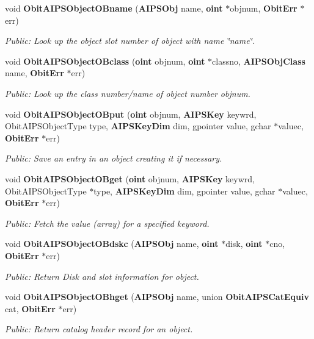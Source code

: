 \begin{CompactItemize}
void {\bf Obit\-AIPSObject\-OBname} ({\bf AIPSObj} name, {\bf oint} $\ast$objnum, {\bf Obit\-Err} $\ast$err)
\begin{CompactList}\small\item\em Public: Look up the object slot number of object with name \char`\"{}name\char`\"{}. \item\end{CompactList}\item 
void {\bf Obit\-AIPSObject\-OBclass} ({\bf oint} objnum, {\bf oint} $\ast$classno, {\bf AIPSObj\-Class} name, {\bf Obit\-Err} $\ast$err)
\begin{CompactList}\small\item\em Public: Look up the class number/name of object number objnum. \item\end{CompactList}\item 
void {\bf Obit\-AIPSObject\-OBput} ({\bf oint} objnum, {\bf AIPSKey} keywrd, Obit\-AIPSObject\-Type type, {\bf AIPSKey\-Dim} dim, gpointer value, gchar $\ast$valuec, {\bf Obit\-Err} $\ast$err)
\begin{CompactList}\small\item\em Public: Save an entry in an object creating it if necessary. \item\end{CompactList}\item 
void {\bf Obit\-AIPSObject\-OBget} ({\bf oint} objnum, {\bf AIPSKey} keywrd, Obit\-AIPSObject\-Type $\ast$type, {\bf AIPSKey\-Dim} dim, gpointer value, gchar $\ast$valuec, {\bf Obit\-Err} $\ast$err)
\begin{CompactList}\small\item\em Public: Fetch the value (array) for a specified keyword. \item\end{CompactList}\item 
void {\bf Obit\-AIPSObject\-OBdskc} ({\bf AIPSObj} name, {\bf oint} $\ast$disk, {\bf oint} $\ast$cno, {\bf Obit\-Err} $\ast$err)
\begin{CompactList}\small\item\em Public: Return Disk and slot information for object. \item\end{CompactList}\item 
void {\bf Obit\-AIPSObject\-OBhget} ({\bf AIPSObj} name, union {\bf Obit\-AIPSCat\-Equiv} cat, {\bf Obit\-Err} $\ast$err)
\begin{CompactList}\small\item\em Public: Return catalog header record for an object. \item\end{CompactList}\item 

\end{CompactItemize}
